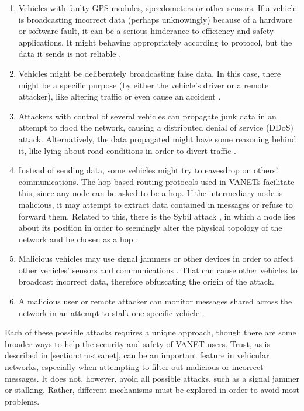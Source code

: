 \begin{enumerate}
	\item 	Vehicles with faulty GPS modules, speedometers or other sensors.
			If a vehicle is broadcasting incorrect data (perhaps unknowingly) because of a hardware or software fault, it can be a serious hinderance to efficiency and safety applications.
			It might behaving appropriately according to protocol, but the data it sends is not reliable \cite{isaac2010security}.
	\item	Vehicles might be deliberately broadcasting false data.
			In this case, there might be a specific purpose (by either the vehicle's driver or a remote attacker), like altering traffic or even cause an accident \cite{golle2004detecting}.
	\item   Attackers with control of several vehicles can propagate junk data in an attempt to flood the network, causing a distributed denial of service (DDoS) attack.
			Alternatively, the data propagated might have some reasoning behind it, like lying about road conditions in order to divert traffic \cite{garip2015congestion}.
	\item	Instead of sending data, some vehicles might try to eavesdrop on others' communications.
			The hop-based routing protocols used in VANETs facilitate this, since any node can be asked to be a hop.
			If the intermediary node is malicious, it may attempt to extract data contained in messages or refuse to forward them.
			Related to this, there is the Sybil attack \cite{isaac2010security}, in which a node lies about its position in order to seemingly alter the physical topology of the network and be chosen as a hop \cite{leinmuller2005influence}.
	\item	Malicious vehicles may use signal jammers or other devices in order to affect other vehicles' sensors and communications \cite{isaac2010security}.
			That can cause other vehicles to broadcast incorrect data, therefore obfuscating the origin of the attack.
	\item	A malicious user or remote attacker can monitor messages shared across the network in an attempt to stalk one specific vehicle \cite{isaac2010security}.
	
\end{enumerate}

Each of these possible attacks requires a unique approach, though there are some broader ways to help the security and safety of VANET users.
Trust, as is described in \autoref{section:trustvanet}, can be an important feature in vehicular networks, especially when attempting to filter out malicious or incorrect messages.
It does not, however, avoid all possible attacks, such as a signal jammer or stalking.
Rather, different mechanisms must be explored in order to avoid most problems.

